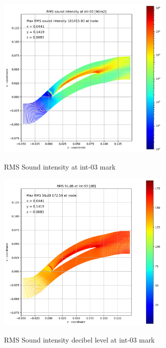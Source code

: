 \begin{figure}[ht]
  \centering
  \includegraphics[width=0.75\textwidth]{Figures/int-03-rms-sil.png} \label{int-03-rms-sil}
  \caption{RMS Sound intensity at int-03 mark}
  
  \vspace*{\floatsep}%

  \includegraphics[width=0.75\textwidth]{Figures/int-03-rms-sildb.png} \label{int-03-rms-sildb}
  \caption{RMS Sound intensity decibel level at int-03 mark}
\end{figure}

